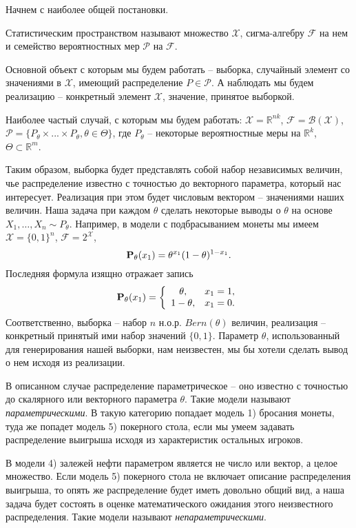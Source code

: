 \documentclass[10 pt,russian]{article}
\begin{document}
Начнем с наиболее общей постановки. 
\begin{Def}
Статистическим пространством называют множество $\mathcal{X}$, сигма-алгебру $\mathcal{F}$ на нем и семейство вероятностных мер $\mathcal{P}$ на $\mathcal{F}$.
\end{Def} 
Основной объект с которым мы будем работать -- выборка, случайный элемент со значениями в $\mathcal{X}$, имеющий распределение $P\in\mathcal{P}$. А наблюдать мы будем реализацию -- конкретный элемент $\mathcal{X}$, значение, принятое выборкой.

Наиболее частый случай, с которым мы будем работать: $\mathcal{X} = \mathbb{R}^{nk}$, $\mathcal{F} = \mathcal{B}(\mathcal{X})$, $\mathcal{P} = \{P_{\theta}\times ... \times P_{\theta}, \theta\in \Theta\}$, где $P_{\theta}$ -- некоторые вероятностные меры на $\mathbb{R}^k$, $\Theta\subset \mathbb{R}^m$.

Таким образом, выборка будет представлять собой набор независимых величин, чье распределение известно с точностью до векторного параметра, который нас интересует. Реализация при этом будет числовым вектором -- значениями наших величин. Наша задача при каждом $\theta$ сделать некоторые выводы о $\theta$ на основе $X_1,\dotsc, X_n\sim P_{\theta}$.
\Exam Например, в модели с подбрасыванием монеты мы имеем $\mathcal{X}=\{0,1\}^n$, $\mathcal{F} = 2^{\mathcal{X}}$, 
$${\bf P}_{\theta}(x_1) = \theta^{x_1} (1-\theta)^{1-x_1}.$$
Последняя формула изящно отражает запись 
$$
{\bf P}_{\theta}(x_1) = \left\{
\begin{array}{cc}
\theta,& x_1=1,\\
1-\theta,& x_1=0.
\end{array}
\right.
$$
Соответственно, выборка -- набор $n$ н.о.р. $Bern(\theta)$ величин, реализация -- конкретный принятый ими набор значений $\{0,1\}$. Параметр $\theta$, использованный для генерирования нашей выборки, нам неизвестен, мы бы хотели сделать вывод о нем исходя из реализации. 

В описанном случае распределение параметрическое -- оно известно с точностью до скалярного или векторного параметра $\theta$. Такие модели называют {\it параметрическими}. В такую категорию попадает модель 1) бросания монеты, туда же попадет модель 5) покерного стола, если мы умеем задавать распределение выигрыша исходя из характеристик остальных игроков.

В модели 4) залежей нефти параметром является не число или вектор, а целое множество. Если модель 5) покерного стола не включает описание распределения выигрыша, то опять же распределение будет иметь довольно общий вид, а наша задача будет состоять в оценке математического ожидания этого неизвестного распределения. Такие модели называют {\it непараметрическими}. 
\end{document}
